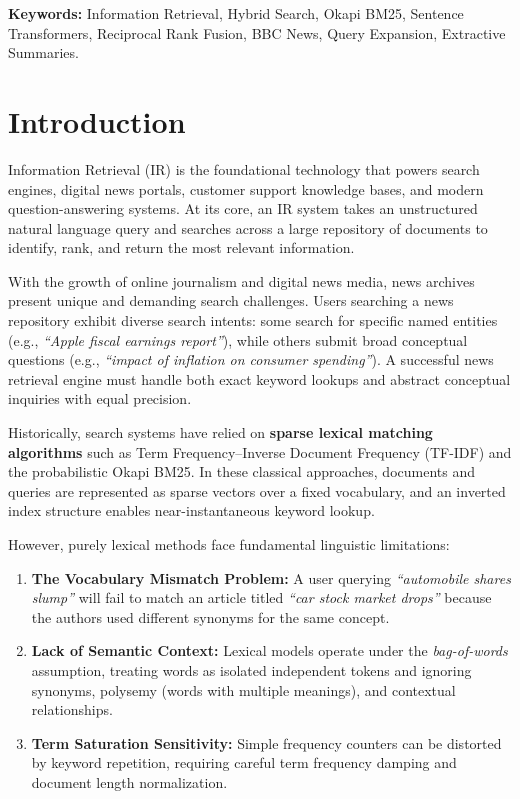 \documentclass[11pt,a4paper]{article}
\begin{document}
\vspace{0.5cm}
\textbf{Keywords:} Information Retrieval, Hybrid Search, Okapi BM25, Sentence Transformers, Reciprocal Rank Fusion, BBC News, Query Expansion, Extractive Summaries.

\newpage
{
\tableofcontents
}
\newpage

\section{Introduction}

Information Retrieval (IR) is the foundational technology that powers search engines, digital news portals, customer support knowledge bases, and modern question-answering systems. At its core, an IR system takes an unstructured natural language query and searches across a large repository of documents to identify, rank, and return the most relevant information.

With the growth of online journalism and digital news media, news archives present unique and demanding search challenges. Users searching a news repository exhibit diverse search intents: some search for specific named entities (e.g., \textit{``Apple fiscal earnings report''}), while others submit broad conceptual questions (e.g., \textit{``impact of inflation on consumer spending''}). A successful news retrieval engine must handle both exact keyword lookups and abstract conceptual inquiries with equal precision.

Historically, search systems have relied on \textbf{sparse lexical matching algorithms} such as Term Frequency--Inverse Document Frequency (TF-IDF) and the probabilistic Okapi BM25. In these classical approaches, documents and queries are represented as sparse vectors over a fixed vocabulary, and an inverted index structure enables near-instantaneous keyword lookup.

However, purely lexical methods face fundamental linguistic limitations:
\begin{enumerate}[label=(\alph*)]
    \item \textbf{The Vocabulary Mismatch Problem:} A user querying \textit{``automobile shares slump''} will fail to match an article titled \textit{``car stock market drops''} because the authors used different synonyms for the same concept.
    \item \textbf{Lack of Semantic Context:} Lexical models operate under the \textit{bag-of-words} assumption, treating words as isolated independent tokens and ignoring synonyms, polysemy (words with multiple meanings), and contextual relationships.
    \item \textbf{Term Saturation Sensitivity:} Simple frequency counters can be distorted by keyword repetition, requiring careful term frequency damping and document length normalization.
\end{enumerate}
\end{document}
